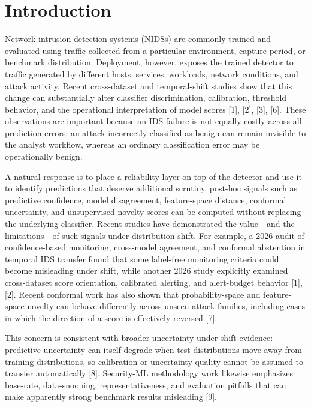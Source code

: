 \documentclass[conference]{IEEEtran}
\begin{document}
\section{Introduction}

Network intrusion detection systems (NIDSs) are commonly trained and evaluated using traffic collected from a particular environment, capture period, or benchmark distribution. Deployment, however, exposes the trained detector to traffic generated by different hosts, services, workloads, network conditions, and attack activity. Recent cross-dataset and temporal-shift studies show that this change can substantially alter classifier discrimination, calibration, threshold behavior, and the operational interpretation of model scores [1], [2], [3], [6]. These observations are important because an IDS failure is not equally costly across all prediction errors: an attack incorrectly classified as benign can remain invisible to the analyst workflow, whereas an ordinary classification error may be operationally benign.

A natural response is to place a reliability layer on top of the detector and use it to identify predictions that deserve additional scrutiny. post-hoc signals such as predictive confidence, model disagreement, feature-space distance, conformal uncertainty, and unsupervised novelty scores can be computed without replacing the underlying classifier. Recent studies have demonstrated the value---and the limitations---of such signals under distribution shift. For example, a 2026 audit of confidence-based monitoring, cross-model agreement, and conformal abstention in temporal IDS transfer found that some label-free monitoring criteria could become misleading under shift, while another 2026 study explicitly examined cross-dataset score orientation, calibrated alerting, and alert-budget behavior [1], [2]. Recent conformal work has also shown that probability-space and feature-space novelty can behave differently across unseen attack families, including cases in which the direction of a score is effectively reversed [7].

This concern is consistent with broader uncertainty-under-shift evidence: predictive uncertainty can itself degrade when test distributions move away from training distributions, so calibration or uncertainty quality cannot be assumed to transfer automatically [8]. Security-ML methodology work likewise emphasizes base-rate, data-snooping, representativeness, and evaluation pitfalls that can make apparently strong benchmark results misleading [9].
\end{document}
